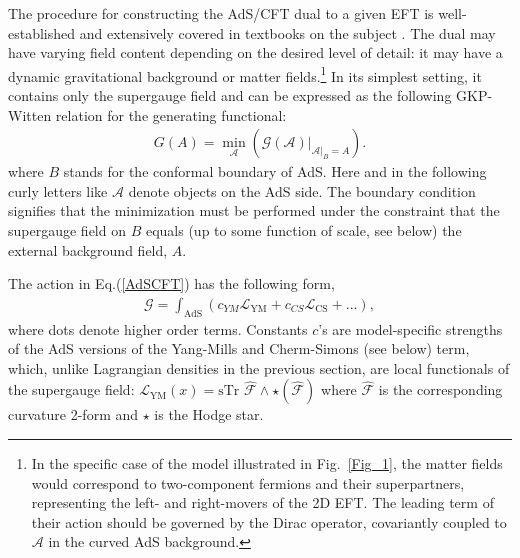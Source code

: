 \documentclass[final,5p,10pt,times,twocolumn,year]{elsarticle}
\begin{document}
The procedure for constructing the AdS/CFT dual to a given EFT is well-established and extensively covered in textbooks on the subject \cite{natsuume2016adscftdualityuserguide,Penedones_2016,KaplanAdSCFT}. The dual may have varying field content depending on the desired level of detail: it may have a dynamic gravitational background or matter fields.\footnote{In the specific case of the model illustrated in Fig.~\ref{Fig_1}, the matter fields would correspond to two-component fermions and their superpartners, representing the left- and right-movers of the 2D EFT. The leading term of their action should be governed by the Dirac operator, covariantly coupled to $\mathcal{A}$ in the curved AdS background.} In its simplest setting, it contains only the supergauge field and can be expressed as the following GKP-Witten relation for the generating functional: 
\begin{eqnarray}
    {G}({A}) = \min_{\mathcal{A}}\left(\left.\mathcal{G}(\mathcal{A})\right|_{\mathcal{A}|_{B} = A}\right).\label{AdSCFT}
\end{eqnarray}
where $B$ stands for the conformal boundary of AdS. Here and in the following curly letters like $\mathcal A$ denote objects on the AdS side. The boundary condition signifies that the minimization must be performed under the constraint that the supergauge field on $B$ equals (up to some function of scale, see below) the external background field, $A$.    

The action in Eq.(\ref{AdSCFT}) has the following form,
\begin{eqnarray}
    \mathcal{G} = \int_\text{AdS} \left(c_{YM} \mathcal{L}_\text{YM} + c_{CS} \mathcal{L}_\text{CS}+...\right),\label{AdSAction}
\end{eqnarray}
where dots denote higher order terms. Constants $c$'s are model-specific strengths of the AdS versions of the Yang-Mills and Cherm-Simons (see below) term, which, unlike Lagrangian densities in the previous section, are local functionals of the supergauge field: $\mathcal{L}_\text{YM}(x) = \text{sTr } \hat {\mathcal F}\wedge \star (\hat {\mathcal F})$ where $\hat {\mathcal F}$ is the corresponding curvature 2-form and $\star$ is the Hodge star.
\end{document}
